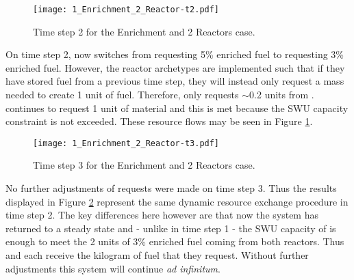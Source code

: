 \begin{figure}
  \begin{center}
    \texttt{[image: 1\_Enrichment\_2\_Reactor-t2.pdf]}
    \caption[]{\label{fig::enr2rxts-t2}Time step 2 for the Enrichment and 2 Reactors 
        case.}
  \end{center}
\end{figure}

On time step 2,  now switches from requesting 5\% enriched fuel to
requesting 3\% enriched fuel.  However, the reactor archetypes are implemented
such that if they have stored fuel from a previous time step, they will instead
only request a mass needed to create 1 unit of fuel.  Therefore,  only
requests $\sim$0.2 units from \Enrichment{}.   continues to request 1 unit
of material and this is met because the SWU capacity constraint is not exceeded.
These resource flows may be seen in Figure \ref{fig::enr2rxts-t2}.

\begin{figure}
  \begin{center}
    \texttt{[image: 1\_Enrichment\_2\_Reactor-t3.pdf]}
    \caption[]{\label{fig::enr2rxts-t3}Time step 3 for the Enrichment and 2 Reactors 
        case.}
  \end{center}
\end{figure}

No further adjustments of requests were made on time step 3. Thus the results
displayed in Figure \ref{fig::enr2rxts-t3} represent the same dynamic resource
exchange procedure in time step 2.  The key differences here however are that
now the system has returned to a steady state and - unlike in time step 1 - the
SWU capacity of \Enrichment{} is enough to meet the 2 units of 3\% enriched fuel
coming from both reactors.  Thus  and  each receive the
kilogram of fuel that they request.  Without further adjustments this system
will continue \emph{ad infinitum}.

